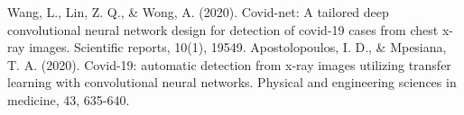 \documentclass[conference]{IEEEtran}
\begin{document}
\begin{thebibliography}{00}

	 Wang, L., Lin, Z. Q., \& Wong, A. (2020). Covid-net: A tailored deep convolutional neural network design for detection of covid-19 cases from chest x-ray images. Scientific reports, 10(1), 19549.
	 Apostolopoulos, I. D., \& Mpesiana, T. A. (2020). Covid-19: automatic detection from x-ray images utilizing transfer learning with convolutional neural networks. Physical and engineering sciences in medicine, 43, 635-640.
\end{thebibliography}
\end{document}
